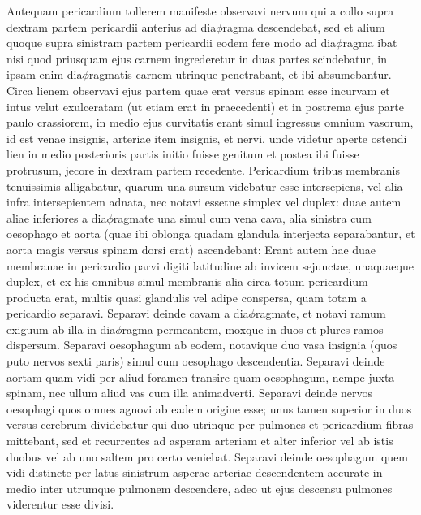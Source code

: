 \pend%
\pstart%
Antequam pericardium tollerem manifeste observavi nervum qui a collo supra dextram partem pericardii anterius ad dia$\phi$ragma descendebat, sed et alium quoque supra sinistram partem pericardii eodem fere modo ad dia$\phi$ragma ibat nisi quod priusquam ejus carnem ingrederetur in duas partes scindebatur, in ipsam enim dia$\phi$ragmatis carnem utrinque penetrabant, et ibi absumebantur. Circa lienem observavi ejus partem quae erat versus spinam esse incurvam et intus velut exulceratam (ut etiam erat in praecedenti) et in postrema ejus parte paulo crassiorem, in medio ejus curvitatis erant simul ingressus omnium vasorum, id est venae insignis, arteriae item insignis, et nervi, unde videtur aperte ostendi lien in medio posterioris partis initio fuisse genitum et postea ibi fuisse protrusum, jecore in dextram partem recedente. Pericardium tribus membranis tenuissimis alligabatur, quarum una sursum videbatur esse intersepiens, vel alia infra intersepientem adnata, nec notavi essetne simplex vel duplex: duae autem aliae inferiores a dia$\phi$ragmate una simul cum vena cava, alia sinistra cum oesophago et aorta (quae ibi oblonga quadam glandula interjecta separabantur, et aorta magis versus spinam dorsi erat) ascendebant: Erant autem hae duae membranae in pericardio parvi digiti latitudine ab invicem sejunctae, unaquaeque duplex, et ex his omnibus simul membranis alia circa totum pericardium producta erat, multis quasi glandulis vel adipe conspersa, quam totam a pericardio separavi. Separavi deinde cavam a dia$\phi$ragmate, et notavi ramum exiguum ab illa in dia$\phi$ragma permeantem, moxque in duos et plures ramos dispersum. Separavi oesophagum ab eodem, notavique duo vasa insignia (quos puto nervos sexti paris) simul cum oesophago descendentia. Separavi deinde aortam quam vidi per aliud foramen transire quam oesophagum, nempe juxta spinam, nec ullum aliud vas cum illa animadverti. Separavi deinde nervos oesophagi quos omnes agnovi ab eadem origine esse; unus tamen superior in duos versus cerebrum dividebatur qui duo utrinque per pulmones et pericardium fibras mittebant, sed et recurrentes ad asperam arteriam et alter inferior vel ab istis duobus vel ab uno saltem pro certo veniebat.
\pend%
\pstart%
Separavi deinde oesophagum quem vidi distincte per latus sinistrum asperae arteriae descendentem accurate in medio inter utrumque pulmonem descendere, adeo ut ejus descensu pulmones viderentur esse divisi.
\pend%
\pstart%
